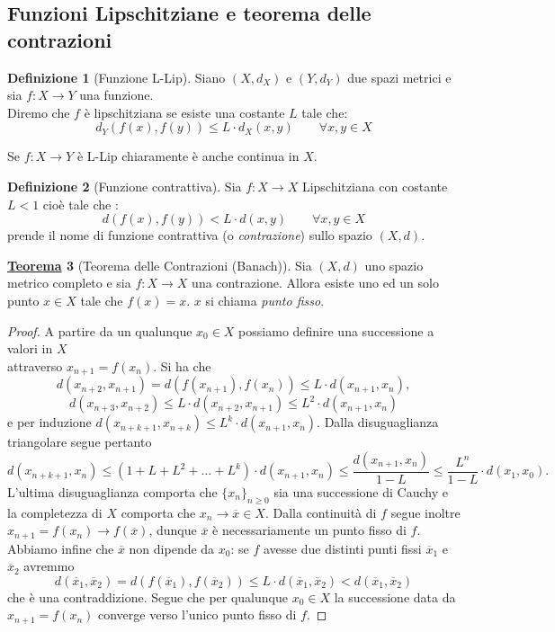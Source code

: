 \documentclass[a4paper,twoside]{article}
\theoremstyle{definition}
\newtheorem{theorem}{\color{Red}\underline{\textrm Teorema}}
\newtheorem{definizione}[theorem]{Definizione}
\numberwithin{theorem}{section}
\begin{document}
\subsection{Funzioni Lipschitziane e teorema delle contrazioni}
\begin{definizione}[Funzione L-Lip]
Siano $(X,d_X)$ e $(Y,d_Y)$ due spazi metrici e sia $f:X\to Y$ una funzione.\\ Diremo che $f$ è lipschitziana se esiste una costante $L$ tale che: $$d_Y(f(x),f(y))\leq L\cdot d_X(x,y)\qquad \forall x,y\in X$$    
\end{definizione}
Se $f:X\to Y$ è L-Lip chiaramente è anche continua in $X$.
\begin{definizione}[Funzione contrattiva]
Sia $f:X\to X$ Lipschitziana con costante $L<1$ cioè tale che :
$$d(f(x),f(y))<L\cdot d(x,y)\qquad\forall x,y\in X$$
prende il nome di funzione contrattiva (o \emph{contrazione}) sullo spazio $(X,d)$.
\end{definizione}
\begin{theorem}[Teorema delle Contrazioni (Banach)]
Sia $(X,d)$ uno spazio metrico completo e sia $f:X\to X$ una contrazione. Allora esiste uno ed un solo punto $x\in X$ tale che $f(x)=x$. $x$ si chiama \emph{punto fisso}.    
\end{theorem}
\begin{proof} A partire da un qualunque $x_0\in X$ possiamo definire una successione a valori in $X$\\ attraverso $x_{n+1}=f(x_n)$. Si ha che 
$$d(x_{n+2},x_{n+1}) = d(f(x_{n+1}),f(x_n)) \leq L\cdot d(x_{n+1},x_n), $$
$$d(x_{n+3},x_{n+2}) \leq L\cdot d(x_{n+2},x_{n+1}) \leq L^2\cdot d(x_{n+1},x_n)$$
e per induzione $d(x_{n+k+1},x_{n+k})\leq L^k\cdot d(x_{n+1},x_{n})$. Dalla disuguaglianza triangolare segue pertanto 
$$ d(x_{n+k+1},x_{n}) \leq \left(1+L+L^2+\ldots+L^k\right)\cdot d(x_{n+1},x_n)\leq \frac{d(x_{n+1},x_n)}{1-L}\leq \frac{L^n}{1-L}\cdot  d(x_1,x_0).$$
L'ultima disuguaglianza comporta che $\{x_n\}_{n\geq 0}$ sia una successione di Cauchy e la completezza di $X$ comporta che $x_n\to \overline{x} \in X$. Dalla continuità di $f$ segue inoltre $x_{n+1}=f(x_n)\to f(\overline{x})$, dunque $\overline{x}$ è necessariamente un punto fisso di $f$. Abbiamo infine che $\overline{x}$ non dipende da $x_0$: se $f$ avesse due distinti punti fissi $\overline{x}_1$ e $\overline{x}_2$ avremmo 
$$ d(\overline{x}_1,\overline{x}_2) = d(f(\overline{x}_1),f(\overline{x}_2)) \leq L\cdot d(\overline{x}_1,\overline{x}_2) < d(\overline{x}_1,\overline{x}_2) $$
che è una contraddizione. Segue che per qualunque $x_0\in X$ la successione data da $x_{n+1}=f(x_n)$ converge verso l'unico punto fisso di $f$.   
\end{proof}
\end{document}
